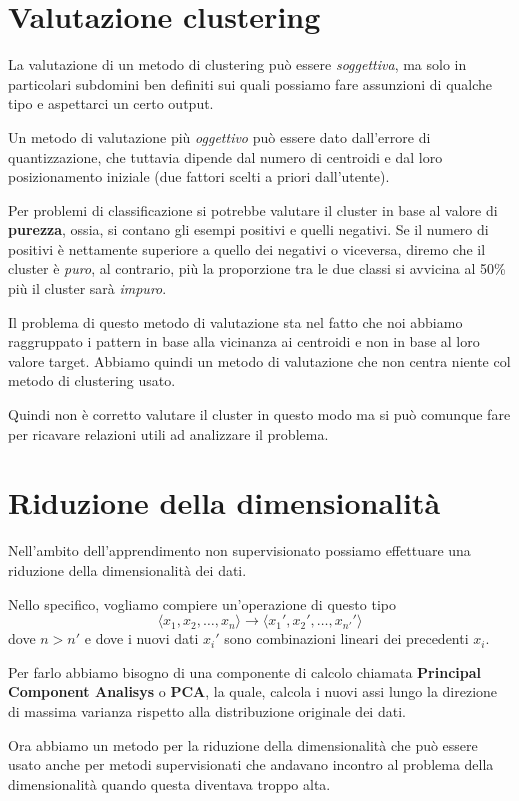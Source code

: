 \section{Valutazione clustering}
La valutazione di un metodo di clustering pu\`o essere \emph{soggettiva}, ma solo in particolari subdomini ben definiti
sui quali possiamo fare assunzioni di qualche tipo e aspettarci un certo output.

Un metodo di valutazione pi\`u \emph{oggettivo} pu\`o essere dato dall'errore di quantizzazione, che tuttavia dipende dal
numero di centroidi e dal loro posizionamento iniziale (due fattori scelti a priori dall'utente).

Per problemi di classificazione si potrebbe valutare il cluster in base al valore di \textbf{purezza}, ossia, si contano
gli esempi positivi e quelli negativi. Se il numero di positivi \`e nettamente superiore a quello dei negativi o viceversa,
diremo che il cluster \`e \emph{puro}, al contrario, pi\`u la proporzione tra le due classi si avvicina al 50\% pi\`u
il cluster sar\`a \emph{impuro}.

Il problema di questo metodo di valutazione sta nel fatto che noi abbiamo raggruppato i pattern in base alla vicinanza
ai centroidi e non in base al loro valore target. Abbiamo quindi un metodo di valutazione che non centra niente col
metodo di clustering usato.

Quindi non \`e corretto valutare il cluster in questo modo ma si pu\`o comunque fare per ricavare relazioni utili ad
analizzare il problema.

\section{Riduzione della dimensionalit\`a}
Nell'ambito dell'apprendimento non supervisionato possiamo effettuare una riduzione della dimensionalit\`a dei dati.

Nello specifico, vogliamo compiere un'operazione di questo tipo
\[ \langle x_1, x_2, \dots, x_n \rangle \rightarrow \langle x_1', x_2', \dots, x_{n'}' \rangle \]
dove $n > n'$ e dove i nuovi dati $x_i'$ sono combinazioni lineari dei precedenti $x_i$.

Per farlo abbiamo bisogno di una componente di calcolo chiamata \textbf{Principal Component Analisys} o \textbf{PCA},
la quale, calcola i nuovi assi lungo la direzione di massima varianza rispetto alla distribuzione originale dei dati.

Ora abbiamo un metodo per la riduzione della dimensionalit\`a che pu\`o essere usato anche per metodi supervisionati
che andavano incontro al problema della dimensionalit\`a quando questa diventava troppo alta.